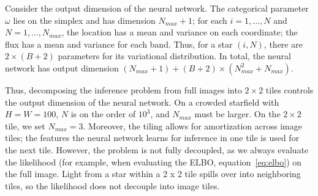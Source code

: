 Consider the output dimension of the neural network. The categorical parameter $\omega$ lies on the 
simplex and has dimension $N_{max} + 1$; for each $i = 1, ..., N$ and $N = 1, ..., N_{max}$, the location has a mean and variance on each coordinate; the flux has a mean and variance for each band. Thus, for a star $(i, N)$, 
there are $2 \times (B + 2)$ parameters for its variational distribution. In total, the neural network has output dimension $(N_{max} + 1) + (B + 2) \times (N_{max}^2 + N_{max})$. 

Thus, decomposing the inference problem from full images into $2 \times 2$ tiles controls the output dimension of the neural network. 
On a crowded starfield with $H = W = 100$, $N$ is on the order of $10^3$, 
and $N_{max}$ must be larger. 
On the $2\times 2$ tile, we set $N_{max} = 3$. 
Moreover, the tiling allows for amortization across image tiles; the features the neural network learns for inference in one tile is used for the next tile.
However, the problem is not fully decoupled, as we always evaluate the likelihood (for example, when evaluating the ELBO, equation~\ref{eq:elbo}) on the full image. 
Light from a star within a 2 x 2 tile spills over into neighboring tiles, so the likelihood does not decouple into image tiles. 

